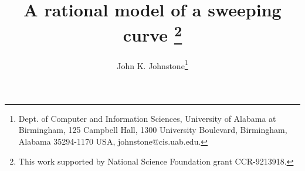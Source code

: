 \newcommand{\SingleSpace}{\edef\baselinestretch{0.9}\Large\normalsize}
\newcommand{\DoubleSpace}{\edef\baselinestretch{1.4}\Large\normalsize}
\newcommand{\Comment}[1]{\relax}  %
\newcommand{\Heading}[1]{\par\noindent{\bf#1}\nobreak}
\newcommand{\Tail}[1]{\nobreak\par\noindent{\bf#1}}
\newcommand{\QED}{\vrule height 1.4ex width 1.0ex depth -.1ex\ } %
\newcommand{\arc}[1]{\mbox{$\stackrel{\frown}{#1}$}}
\newcommand{\lyne}[1]{\mbox{$\stackrel{\leftrightarrow}{#1}$}}
\newcommand{\ray}[1]{\mbox{$\vec{#1}$}}          
\newcommand{\seg}[1]{\mbox{$\overline{#1}$}}
\newcommand{\tab}{\hspace*{.2in}}
\newcommand{\se}{\mbox{$_{\epsilon}$}}  %
\newcommand{\ie}{\mbox{i.e.}}
\newcommand{\eg}{\mbox{e.\ g.\ }}
\newcommand{\figg}[3]{\begin{figure}[htbp]\vspace{#3}\caption{#2}\label{#1}\end{figure}}
\newcommand{\be}{\begin{equation}}
\newcommand{\ee}{\end{equation}}
\newcommand{\prf}{\noindent{{\bf Proof} :\ }}
\newcommand{\choice}[2]{\left( \begin{array}{c} \mbox{\footnotesize{#1}} \\ \mbox{\footnotesize{#2}} \end{array} \right)}      
\newcommand{\ddt}{\frac{\partial}{\partial t}}

\newtheorem{rmk}{Remark}[section]
\newtheorem{example}{Example}[section]
\newtheorem{conjecture}{Conjecture}[section]
\newtheorem{claim}{Claim}[section]
\newtheorem{notation}{Notation}[section]
\newtheorem{lemma}{Lemma}[section]
\newtheorem{theorem}{Theorem}[section]
\newtheorem{corollary}{Corollary}[section]
\newtheorem{defn2}{Definition}

\ifFull                                          
\SingleSpace
\else
\DoubleSpace
\fi

\setlength{\oddsidemargin}{0pt}
\setlength{\evensidemargin}{0pt}
\setlength{\headsep}{0pt}
\setlength{\topmargin}{0pt}
\setlength{\textheight}{8.75in}
\setlength{\textwidth}{6.5in}
\setlength{\headsep}{.2in}

\title{
A rational model of a sweeping curve
        \thanks{This work supported by National Science Foundation grant
        CCR-9213918.}}
\author{John K. Johnstone\thanks{Dept. of Computer and Information 
	Sciences,
	University of Alabama at Birmingham,
	125 Campbell Hall, 1300 University Boulevard,
	Birmingham, Alabama  35294-1170 USA, johnstone@cis.uab.edu.}}


